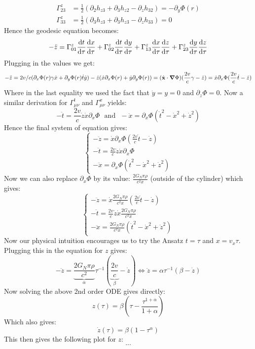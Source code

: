 \documentclass[10pt,a4paper]{article}
\begin{document}
\begin{enumerate}
\begin{enumerate}
\begin{align*}
\Gamma^{z}_{23} &= \frac{1}{2}(\partial_2 h_{z 3} + \partial_3 h_{z2} - \partial_z h_{32}) = - \partial_y \Phi(r)\\
\Gamma^z_{33} &= \frac{1}{2} (\partial_{3} h_{z3} + \partial_3 h_{z3} - \partial_z h_{33}) = 0
\end{align*}
Hence the geodesic equation becomes:
\[
-\ddot{z} = \Gamma^z_{01} \dv{t}{\tau} \dv{x}{\tau} + \Gamma^z_{02} \dv{t}{\tau} \dv{y}{\tau} + \Gamma^z_{13} \dv{x}{\tau}\dv{z}{\tau} + \Gamma^z_{23} \dv{y}{\tau}\dv{z}{\tau}
\]
Plugging in the values we get:
\[
-\ddot{z} = 2v/c( \partial_x \Phi(r) \gamma \dot{x} + \partial_y \Phi(r) \dot{t} \dot{y}) - \dot{z}( \dot{x} \partial_x \Phi(r)  + \dot{y}\partial_y \Phi(r)  )  = (\dot{\vb{x}} \cdot \grad \Phi) (\frac{2v}{c} \gamma - \dot{z}) = \dot{x} \partial_x \Phi (\frac{2v}{c} \dot{t} - \dot{z})
\]
Where in the last equality we used the fact that $\dot{y} = y = 0$ and $\partial_z\Phi = 0$. Now a similar derivation for $\Gamma^t_{\mu \nu}$ and $\Gamma^x_{\mu \nu}$ yields:
\[
-\ddot{t} = \frac{2 v}{c} \dot{z} \dot{x} \partial_x \Phi \mbox{~~and~~}  -\ddot{x} = \partial_x \Phi (\dot{t}^2 - \dot{x}^2 + \dot{z}^2)
\]
Hence the final system of equation gives:
\[
\begin{cases}
-\ddot{z} = \dot{x} \partial_x \Phi \left( \frac{2v}{c} \dot{t} - \dot{z} \right)\\
-\ddot{t} = \frac{2v}{c} \dot{z}\dot{x} \partial_x \Phi\\
-\ddot{x} = \partial_x\Phi (\dot{t}^2 - \dot{x}^2 + \dot{z}^2)
\end{cases}
\]
Now we can also replace $\partial_x \Phi$ by its value: $\frac{2 G_N \pi \rho }{c^2 x}$ (outside of the cylinder) which gives:
\[
\begin{cases}
-\ddot{z} = \dot{x} \frac{2 G_N \pi \rho}{c^2 x} \left( \frac{2v}{c} \dot{t} - \dot{z} \right)\\
-\ddot{t} = \frac{2v}{c} \dot{z}\dot{x} \frac{2 G_N \pi \rho}{c^2 x}\\
-\ddot{x} = \frac{2 G_N \pi \rho}{c^2 x} (\dot{t}^2 - \dot{x}^2 + \dot{z}^2)
\end{cases}
\]
Now our physical intuition encourages us to try the Ansatz $t =  \tau$ and $x = v_x \tau$. Plugging this in the equation for $z$ gives:
\[
-\ddot{z} = \underbrace{\frac{2 G_N \pi \rho}{c^2}}_{\alpha} \tau^{-1} \left( \underbrace{\frac{2v}{c}}_{\beta} - \dot{z} \right) \Longleftrightarrow \ddot{z} = \alpha\tau^{-1}(\beta - \dot{z})
\]
Now solving the above 2nd order ODE gives directly:
\[
z(\tau) = \beta\left( \tau - \frac{\tau^{1 + \alpha}}{1 + \alpha} \right)
\]
Which also gives:
\[
\dot{z}(\tau) = \beta(1 - \tau^{\alpha})
\]
This then gives the following plot for $z$:
\[
...
\]

\end{enumerate}


\end{enumerate}
\end{document}
